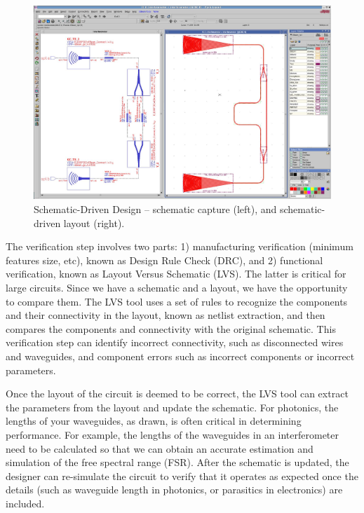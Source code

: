 \documentclass[journal]{spie}
\begin{document}
\begin{figure}[tbp]
	\centering
	\includegraphics[width=\textwidth]{../figs_paper/SDL_pic_2.JPG}
    \caption[]{Schematic-Driven Design -- schematic capture (left), and schematic-driven layout (right).}
    \label{SDL_pic_2}
\end{figure}

The verification step involves two parts: 1) manufacturing verification (minimum features size, etc), known as Design Rule Check (DRC), and 2) functional verification, known as Layout Versus Schematic  (LVS).  The latter is critical for large circuits.  Since we have a schematic and a layout, we have the opportunity to compare them.  The LVS tool uses a set of rules to recognize the components and their connectivity in the layout, known as netlist extraction, and then compares the components and connectivity with the original schematic.  This verification step can identify incorrect connectivity, such as disconnected wires and waveguides, and component errors such as incorrect components or incorrect parameters.

Once the layout of the circuit is deemed to be correct, the LVS tool can extract the parameters from the layout and update the schematic.  For photonics, the lengths of your waveguides, as drawn, is often critical in determining performance.  For example, the lengths of the waveguides in an interferometer need to be calculated so that we can obtain an accurate estimation and simulation of the free spectral range (FSR). After the schematic is updated, the designer can re-simulate the circuit to verify that it operates as expected once the details (such as waveguide length in photonics, or parasitics in electronics) are included.
\end{document}
